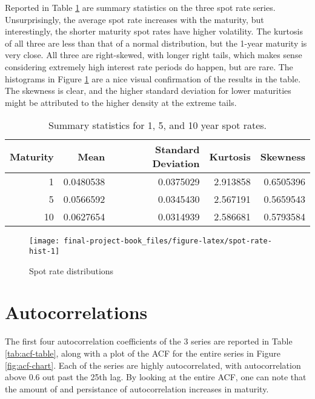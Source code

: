\documentclass[openany]{book}
\theoremstyle{definition}
\theoremstyle{definition}
\theoremstyle{definition}
\theoremstyle{remark}
\begin{document}
Reported in Table \ref{tab:spot-rate-summary} are summary statistics on
the three spot rate series. Unsurprisingly, the average spot rate
increases with the maturity, but interestingly, the shorter maturity
spot rates have higher volatility. The kurtosis of all three are less
than that of a normal distribution, but the 1-year maturity is very
close. All three are right-skewed, with longer right tails, which makes
sense considering extremely high interest rate periods do happen, but
are rare. The histograms in Figure \ref{fig:spot-rate-hist} are a nice
visual confirmation of the results in the table. The skewness is clear,
and the higher standard deviation for lower maturities might be
attributed to the higher density at the extreme tails.

\small

\begin{table}[H]

\caption{\label{tab:spot-rate-summary}Summary statistics for 1, 5, and 10 year spot rates.}
\centering
\begin{tabular}[t]{rrrrr}
\toprule
Maturity & Mean & Standard Deviation & Kurtosis & Skewness\\
\midrule
1 & 0.0480538 & 0.0375029 & 2.913858 & 0.6505396\\
5 & 0.0566592 & 0.0345430 & 2.567191 & 0.5659543\\
10 & 0.0627654 & 0.0314939 & 2.586681 & 0.5793584\\
\bottomrule
\end{tabular}
\end{table}

\normalsize

\small

\begin{figure}[H]

{\centering \texttt{[image: final-project-book\_files/figure-latex/spot-rate-hist-1]} 

}

\caption{Spot rate distributions}\label{fig:spot-rate-hist}
\end{figure}

\normalsize

\hypertarget{autocorrelations}{%
\section{Autocorrelations}\label{autocorrelations}}

The first four autocorrelation coefficients of the 3 series are reported
in Table \ref{tab:acf-table}, along with a plot of the ACF for the
entire series in Figure \ref{fig:acf-chart}. Each of the series are
highly autocorrelated, with autocorrelation above 0.6 out past the 25th
lag. By looking at the entire ACF, one can note that the amount of and
persistance of autocorrelation increases in maturity.
\end{document}
